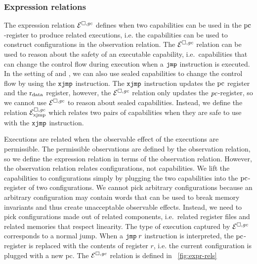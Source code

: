 \begin{jversion}
\subsubsection{Expression relations}
The expression relation $\mathcal{E}^{\square,\mathit{gc}}$ defines when two capabilities can be used in the $\mathrm{pc}$-register to produce related executions, i.e. the capabilities can be used to construct configurations in the observation relation.
The $\mathcal{E}^{\square,\mathit{gc}}$ relation can be used to reason about the safety of an executable capability, i.e.\ capabilities that can change the control flow during execution when a $\tjmp{}$ instruction is executed.
In the setting of \srccm{} and \trgcm{}, we can also use sealed capabilities to change the control flow by using the $\txjmp{}{}$ instruction.
The $\txjmp{}{}$ instruction updates the $\mathrm{pc}$ register and the $\mathrm{r}_\mathrm{data}$ register, however, the $\mathcal{E}^{\square,\mathit{gc}}$ relation only updates the $\mathit{pc}$-register, so we cannot use $\mathcal{E}^{\square,\mathit{gc}}$ to reason about sealed capabilities.
Instead, we define the relation $\mathcal{E}^{\square,\mathit{gc}}_{\mathrm{xjmp}}$ which relates two pairs of capabilities when they are safe to use with the $\txjmp{}{}$ instruction.

Executions are related when the observable effect of the executions are permissible.
The permissible observations are defined by the observation relation, so we define the expression relation in terms of the observation relation.
However, the observation relation relates configurations, not capabilities.
We lift the capabilities to configurations simply by plugging the two capabilities into the $\mathrm{pc}$-register of two configurations.
We cannot pick arbitrary configurations because an arbitrary configuration may contain words that can be used to break memory invariants and thus create unacceptable observable effects.
Instead, we need to pick configurations made out of related components, i.e.\ related register files and related memories that respect linearity.
The type of execution captured by $\mathcal{E}^{\square,\mathit{gc}}$ corresponds to a normal jump.
When a $\tjmp r$ instruction is interpreted, the $\mathrm{pc}$-register is replaced with the contents of register $r$, i.e. the current configuration is plugged with a new pc.
The $\mathcal{E}^{\square,\mathit{gc}}$ relation is defined in \figurename~\ref{fig:expr-rels}


\end{jversion}
